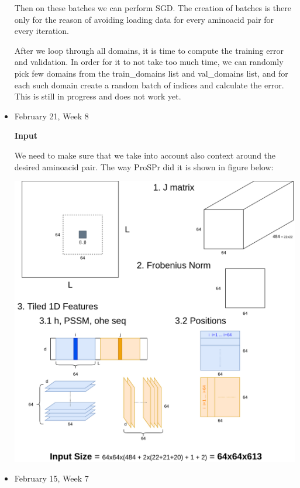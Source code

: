 \documentclass[11pt]{article}
\begin{document}
\begin{itemize}
    Then on these batches we can perform SGD. The creation of batches is there only for the reason of avoiding loading data for every aminoacid pair for every iteration.
    
    After we loop through all domains, it is time to compute the  training error and validation. In order for it to not take too much time, we can randomly pick few domains from the train\_domains list and val\_domains list, and for each such domain create a random batch of indices and calculate the error. This is still in progress and does not work yet.

    \item February 21, Week 8
    
    \begin{Large}
    \textbf{Input}
    \end{Large}

    We need to make sure that we take into account also context around the desired aminoacid pair. The way ProSPr did it is shown in figure below:
    
    \begin{center}
        \includegraphics[scale = .25]{imgs_tomas/input_diagram.png}
    \end{center}

    \item February 15, Week 7
    

\end{itemize}
\end{document}
